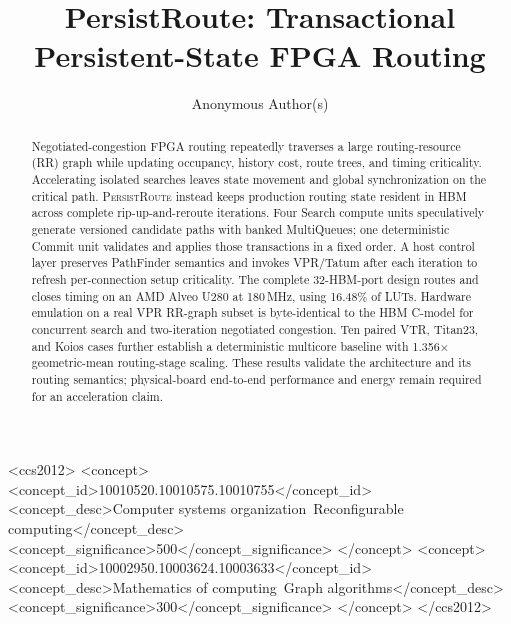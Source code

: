 \documentclass[sigconf,anonymous,review]{acmart}
\newcommand{\system}{\textsc{PersistRoute}}
\begin{document}
\title{PersistRoute: Transactional Persistent-State FPGA Routing}

\author{Anonymous Author(s)}

\begin{abstract}
Negotiated-congestion FPGA routing repeatedly traverses a large routing-resource
(RR) graph while updating occupancy, history cost, route trees, and timing
criticality. Accelerating isolated searches leaves state movement and global
synchronization on the critical path. \system{} instead keeps production
routing state resident in HBM across complete rip-up-and-reroute iterations.
Four Search compute units speculatively generate versioned candidate paths with
banked MultiQueues; one deterministic Commit unit validates and applies those
transactions in a fixed order. A host control layer preserves PathFinder
semantics and invokes VPR/Tatum after each iteration to refresh per-connection
setup criticality. The complete 32-HBM-port design routes and closes timing on
an AMD Alveo U280 at 180\,MHz, using 16.48\% of LUTs. Hardware emulation on a
real VPR RR-graph subset is byte-identical to the HBM C-model for concurrent
search and two-iteration negotiated congestion. Ten paired VTR, Titan23, and
Koios cases further establish a deterministic multicore baseline with
1.356$\times$ geometric-mean routing-stage scaling. These results validate the
architecture and its routing semantics; physical-board end-to-end performance
and energy remain required for an acceleration claim.
\end{abstract}

\begin{CCSXML}
<ccs2012>
 <concept>
  <concept_id>10010520.10010575.10010755</concept_id>
  <concept_desc>Computer systems organization~Reconfigurable computing</concept_desc>
  <concept_significance>500</concept_significance>
 </concept>
 <concept>
  <concept_id>10002950.10003624.10003633</concept_id>
  <concept_desc>Mathematics of computing~Graph algorithms</concept_desc>
  <concept_significance>300</concept_significance>
 </concept>
</ccs2012>
\end{CCSXML}

\maketitle
\end{document}
